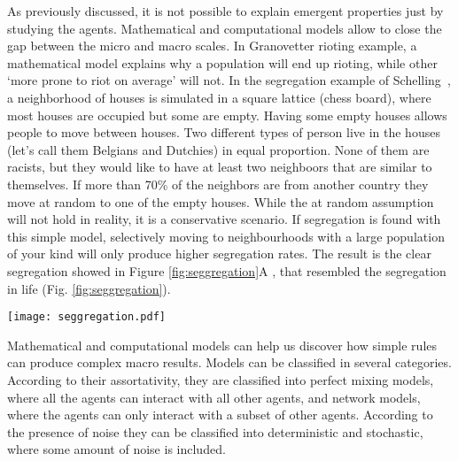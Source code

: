 As previously discussed, it is not possible to explain emergent properties just by studying the agents.
Mathematical and computational models allow to close the gap between the micro and macro scales.
In Granovetter rioting example, a mathematical model explains why a population will end up rioting, while other `more prone to riot on average' will not.
In the segregation example of Schelling~\citep{schelling2006}, 
a neighborhood of houses is simulated in a square lattice (chess board), 
where most houses are occupied but some are empty. 
Having some empty houses allows people to move between houses.
Two different types of person live in the houses (let’s call them Belgians and Dutchies) in equal proportion.
None of them are racists, but they would like to have at least two neighboors that are similar to themselves.
If more than 70\% of the neighbors are from another country they move at random to one of the empty houses. 
While the at random assumption will not hold in reality, it is a conservative scenario.
If segregation is found with this simple model, selectively moving to neighbourhoods with a large population of your kind will only produce higher segregation rates.
The result is the clear segregation showed in Figure \ref{fig:seggregation}A , that resembled the segregation in life (Fig. \ref{fig:seggregation}).


\begin{figure*}
\begin{center}
\texttt{[image: seggregation.pdf]}
\caption{\textbf{Segretation in the simulation and in New York City.} (A) End result of the simulation from \url{http://nifty.stanford.edu/2014/mccown-schelling-model-segregation/}. (B) Segregation in New York City. Blue colors reflect areas with a majority of black people, orange areas are Hispanic. green areas are Asian and pink areas are white.}
\label{fig:seggregation}
\end{center}
\end{figure*}



Mathematical and computational models can help us discover how simple rules can produce complex macro results. 
Models can be classified in several categories. 
According to their assortativity, they are classified into 
perfect mixing models, where all the agents can interact with all other agents,
and network models, where the agents can only interact with a subset of other agents.
According to the presence of noise they can be classified into
deterministic and stochastic, where some amount of noise is included.

